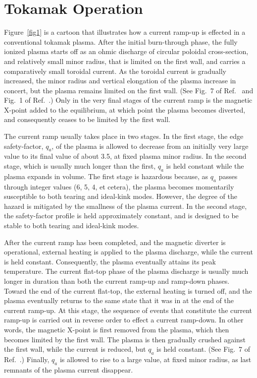 \documentclass[12pt,prb,aps]{revtex4-1}
\begin{document}
\section{Tokamak Operation}
Figure~\ref{fig1} is a cartoon that illustrates how a current ramp-up is effected in a conventional tokamak plasma.\cite{lister,federici, jackson,politzer}
After the initial burn-through phase, the fully ionized plasma starts off as an ohmic  discharge of circular poloidal cross-section, and relatively
small minor radius, that is limited on the first wall, and carries a comparatively small toroidal current. As the toroidal current is
gradually increased, the minor radius and vertical elongation of the plasma increase in concert, but the plasma remains limited on
the first wall. (See Fig.~7 of Ref.~ and Fig.~1 of Ref.~.) Only in the very final stages of the current ramp is the magnetic X-point added to the equilibrium, at which point the
plasma becomes diverted, and consequently ceases to be limited by the first wall. 

The current ramp usually takes place in two stages. In the first stage, the edge safety-factor, $q_a$, of the  plasma is allowed to decrease from
an initially very large value to its final value of about 3.5, at fixed plasma minor radius. In the second stage, which is usually much longer than the first, $q_a$ is held constant
while the plasma expands in volume. The first stage is hazardous because, as $q_a$ passes through integer values (6, 5, 4, et cetera), the plasma becomes
momentarily susceptible  to both tearing and ideal-kink modes.\cite{wesson,cheng} However, the degree of the hazard is mitigated by the smallness of the plasma current.
In the second stage, the safety-factor profile is  held approximately constant, and is designed to be stable to both tearing and ideal-kink modes. 

After the current ramp has been completed, and the magnetic diverter is operational,  external heating is applied to the plasma discharge, while the  current is held constant.
Consequently, 
the plasma eventually attains its peak temperature. The current flat-top phase of the plasma discharge is usually much longer in duration than both the current ramp-up and ramp-down
phases. Toward the end of the current flat-top, the external heating is turned off, and the plasma eventually returns to the same state that it was in at the end of the
current ramp-up. At this stage, the sequence of events that constitute the current ramp-up is carried out in reverse order to effect a current ramp-down. In other words, the magnetic X-point
is first removed from the plasma, which  then becomes limited by the first wall. The plasma is then gradually crushed against the first wall, while the current is reduced, but
$q_a$ is held constant. (See Fig.~7 of Ref.~.) Finally, $q_a$ is allowed to rise to a large value, at fixed minor radius,  as last remnants of the plasma current disappear. 
\end{document}
